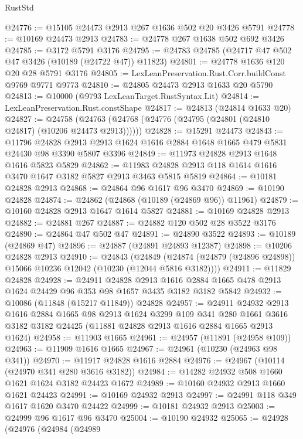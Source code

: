 \begin{lexlean}{RustStd}
\begin{coremodule}
@24776 := @15105 @24473 @2913 @267 @1636 @502 @20 @3426 @5791
@24778 := @10169 @24473 @2913
@24783 := @24778 @267 @1638 @502 @692 @3426
@24785 := @3172 @5791 @3176
@24795 := @24783 @24785 (@24717 @47 @502 @47 @3426 (@10189 (@24722 @47)) @11823)
@24801 := @24778 @1636 @120 @20 @28 @5791 @3176
@24805 := LexLeanPreservation.Rust.Corr.buildConst @9769 @9771 @9773
@24810 := @24805 @24473 @2913 @1633 @20 @5790
@24813 := @10000 (@9793 LexLeanTarget.RustSyntax.Lit)
@24814 := LexLeanPreservation.Rust.constShape
@24817 := @24813 (@24814 @1633 @20)
@24827 := @24758 (@24763 (@24768 (@24776 (@24795 (@24801 (@24810 @24817) (@10206 @24473 @2913))))))
@24828 := @15291 @24473
@24843 := @11796
    @24828
    @2913
    @2913
    @1624
    @1616
    @2884
    @1648
    @1665
    @479
    @5831
    @24430
    @98
    @3390
    @5807
    @3396
@24849 := @11973 @24828 @2913 @1648 @1616 @5823 @5829
@24862 := @11983 @24828 @2913 @118 @1614 @1616 @3470 @1647 @3182 @5827 @2913 @3463 @5815 @5819
@24864 := @10181 @24828 @2913
@24868 := @24864 @96 @1617 @96 @3470
@24869 := @10190 @24828
@24874 := @24862 (@24868 (@10189 (@24869 @96)) @11961)
@24879 := @10160 @24828 @2913 @1647 @1614 @5827
@24881 := @10169 @24828 @2913
@24882 := @24881 @267
@24887 := @24882 @120 @502 @28 @3522 @3176
@24890 := @24864 @47 @502 @47
@24891 := @24890 @3522
@24893 := @10189 (@24869 @47)
@24896 := @24887 (@24891 @24893 @12387)
@24898 := @10206 @24828 @2913
@24910 := @24843
    (@24849 (@24874 (@24879 (@24896 @24898)) @15066 @10236 @12042 (@10230 (@12044 @5816 @3182))))
@24911 := @11829 @24828
@24928 := @24911
    @24828
    @2913
    @1616
    @2884
    @1665
    @478
    @2913
    @1624
    @24429
    @96
    @353
    @98
    @1657
    @3435
    @3182
    @3182
    @5842
@24932 := @10086 (@11848 (@15217 @11849)) @24828
@24957 := @24911
    @24932
    @2913
    @1616
    @2884
    @1665
    @98
    @2913
    @1624
    @3299
    @109
    @341
    @280
    @1661
    @3616
    @3182
    @3182
    @24425
    (@11881 @24828 @2913 @1616 @2884 @1665 @2913 @1624)
@24958 := @11903 @1665
@24961 := @24957 (@11891 (@24958 @109))
@24963 := @11909 @1616 @1665
@24967 := @24961 (@10230 (@24963 @98 @341))
@24970 := @11917 @24828 @1616 @2884
@24976 := @24967 (@10114 (@24970 @341 @280 @3616 @3182))
@24984 := @14282 @24932 @508 @1660 @1621 @1624 @3182 @24423 @1672
@24989 := @10160 @24932 @2913 @1660 @1621 @24423
@24991 := @10169 @24932 @2913
@24997 := @24991 @118 @349 @1617 @1620 @3470 @24422
@24999 := @10181 @24932 @2913
@25003 := @24999 @96 @1617 @96 @3470
@25004 := @10190 @24932
@25065 := @24928
    (@24976
      (@24984
        (@24989

\end{coremodule}
\end{lexlean}
